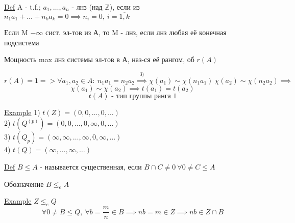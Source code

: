 \documentclass[a4paper]{article}
\begin{document}
\begin{tcolorbox}
\underline{Def} A - t.f.; $ a_1, \dots, a_n $ - лнз (над $ \mathbb{Z} $), 
если из $ n_1 a_1 + \dots + n_k a_k = 0 \implies n_i = 0,\ i = \overline{1,k} $ 

Если M $ - \infty $ сист. эл-тов из А, то M - лнз, если лнз любая её конечная подсистема

Мощность max лнз системы эл-тов в А, наз-ся её рангом, об $ r(A) $ 
\end{tcolorbox}

\begin{tcolorbox}
\[
    r(A) = 1 => \forall a_1, a_2 \in A: \ n_1 a_1 = n_2 a_2 \stackrel{3)}{\implies}
    \chi(a_1) \sim \chi(n_1 a_1) \ \chi(a_2) \sim \chi(n_2 a_2) \implies
\]
\[
    \chi(a_1) \sim \chi(a_2) \implies t(a_1) = t(a_2)
\]
\[
    t(A) \text{ - тип группы ранга 1}
\]
\end{tcolorbox}

\begin{tcolorbox}
\underline{Example} 1) $ t(Z) = (0, 0, \dots, 0, \dots) $\\
2) $ t(Q^{(p)}) = (0, 0, \dots, 0, \infty, 0, \dots) $ \\
3) $ t(Q_{p}) = (\infty, \infty, \dots, \infty, 0, \infty, \dots) $ \\
4) $ t(Q) = (\infty, \dots, \infty, \dots) $ 
\end{tcolorbox}

\begin{tcolorbox}
\underline{Def} $ B \leq A $ - называется существенная, если $ B \cap C \neq 0
\ \forall 0 \neq C \leq A$  

Обозначение $ B \leq_e A $ 
\end{tcolorbox}

\begin{tcolorbox}
\underline{Example} $ Z \leq_e Q $ 
\[
    \forall 0 \neq B \leq Q, \ \forall b = \frac{m}{n}  \in B \implies
    nb = m \in Z \implies nb \in Z \cap B
\]
\end{tcolorbox}
\end{document}
